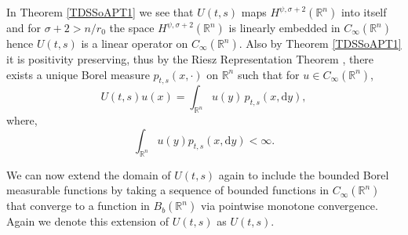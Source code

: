 \documentclass[a4paper, 12pt]{report}
\theoremstyle{cor}
\theoremstyle{remark}
\theoremstyle{definition}
\begin{document}
In Theorem \ref{TDSSoAPT1} we see that $U(t, s)$ maps $H^{\psi, \sigma + 2}(\mathbb{R}^n)$ into itself and for $\sigma + 2 > n/r_0$ the space $H^{\psi, \sigma + 2}(\mathbb{R}^n)$ is linearly embedded in $C_\infty(\mathbb{R}^n)$ hence $U(t, s)$ is a linear operator on $C_\infty(\mathbb{R}^n)$.  Also by Theorem \ref{TDSSoAPT1} it is positivity preserving, thus by the Riesz Representation Theorem \cite[Theorem 2.3.4.C]{Vol1}, there exists a unique Borel measure $p_{t, s}(x, \cdot)$ on $\mathbb{R}^n$ such that for $u \in C_\infty(\mathbb{R}^n)$,
\begin{equation}
U(t, s)u(x) = \int_{\mathbb{R}^n}u(y)\,p_{t, s}(x, \mathrm{d}y),
\end{equation}
where,
\begin{equation}\label{BOoVaI}
\int_{\mathbb{R}^n}u(y)p_{t, s}(x, \mathrm{d}y) < \infty.
\end{equation}

We can now extend the domain of $U(t, s)$ again to include the bounded Borel measurable functions by taking a sequence of bounded functions in $C_\infty(\mathbb{R}^n)$ that converge to a function in $B_b(\mathbb{R}^n)$ via pointwise monotone convergence.  Again we denote this extension of $U(t, s)$ as $U(t, s)$.
\end{document}
